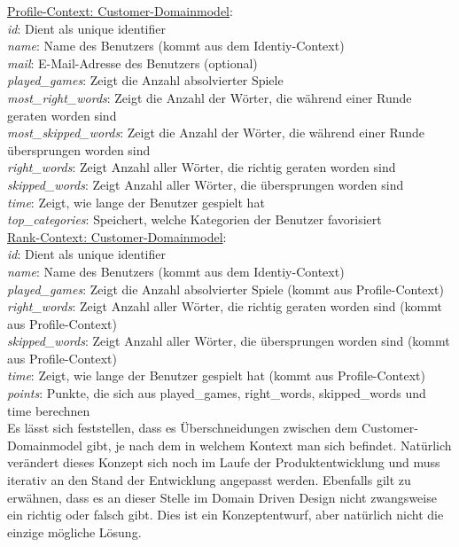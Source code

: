 {\underline{Profile-Context: Customer-Domainmodel}:\\
\textit{id}: Dient als unique identifier \\
\textit{name}: Name des Benutzers (kommt aus dem Identiy-Context)\\
\textit{mail}: E-Mail-Adresse des Benutzers (optional)\\
\textit{played\_games}: Zeigt die Anzahl absolvierter Spiele\\
\textit{most\_right\_words}: Zeigt die Anzahl der Wörter, die während einer Runde geraten worden sind\\
\textit{most\_skipped\_words}: Zeigt die Anzahl der Wörter, die während einer Runde übersprungen worden sind\\
\textit{right\_words}: Zeigt Anzahl aller Wörter, die richtig geraten worden sind\\
\textit{skipped\_words}: Zeigt Anzahl aller Wörter, die übersprungen worden sind\\
\textit{time}: Zeigt, wie lange der Benutzer gespielt hat \\
\textit{top\_categories}: Speichert, welche Kategorien der Benutzer favorisiert\\

\underline{Rank-Context: Customer-Domainmodel}:\\
\textit{id}: Dient als unique identifier \\
\textit{name}: Name des Benutzers (kommt aus dem Identiy-Context)\\
\textit{played\_games}: Zeigt die Anzahl absolvierter Spiele (kommt aus Profile-Context)\\
\textit{right\_words}: Zeigt Anzahl aller Wörter, die richtig geraten worden sind (kommt aus Profile-Context)\\
\textit{skipped\_words}: Zeigt Anzahl aller Wörter, die übersprungen worden sind (kommt aus Profile-Context)\\
\textit{time}: Zeigt, wie lange der Benutzer gespielt hat (kommt aus Profile-Context)\\
\textit{points}: Punkte, die sich aus played\_games, right\_words, skipped\_words und time berechnen \\

Es lässt sich feststellen, dass es Überschneidungen zwischen dem Customer-Domainmodel gibt, je nach dem in welchem Kontext man sich befindet. Natürlich verändert dieses Konzept sich noch im Laufe der Produktentwicklung und muss iterativ an den Stand der Entwicklung angepasst werden. Ebenfalls gilt zu erwähnen, dass es an dieser Stelle im Domain Driven Design nicht zwangsweise ein richtig oder falsch gibt. Dies ist ein Konzeptentwurf, aber natürlich nicht die einzige mögliche Lösung.

}
